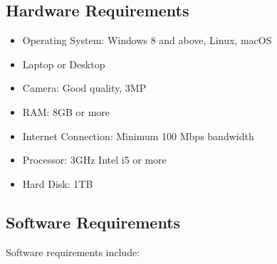 \documentclass[11pt]{report}
\begin{document}
    \subsection{Hardware Requirements}
    \begin{itemize}
        \item Operating System: Windows 8 and above, Linux, macOS
        \item Laptop or Desktop
        \item Camera: Good quality, 3MP
        \item RAM: 8GB or more
        \item Internet Connection: Minimum 100 Mbps bandwidth
        \item Processor: 3GHz Intel i5 or more
        \item Hard Disk: 1TB
\end{itemize}

\subsection{Software Requirements}
Software requirements include:
\end{document}
